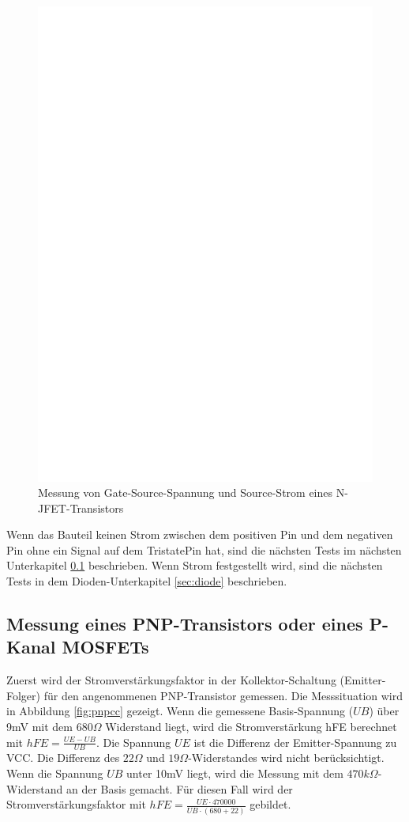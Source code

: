 \begin{figure}[H]
\centering
\includegraphics[]{../FIG/JFETcd.eps}
\caption{Messung von Gate-Source-Spannung und Source-Strom eines N-JFET-Transistors}
\label{fig:JFETcd}
\end{figure}

Wenn das Bauteil keinen Strom zwischen dem positiven Pin und dem negativen Pin ohne ein Signal
auf dem TristatePin hat, sind die n\"achsten Tests im n\"achsten Unterkapitel \ref{sec:pnp} beschrieben.
Wenn Strom festgestellt wird, sind die n\"achsten Tests in dem Dioden-Unterkapitel \ref{sec:diode} beschrieben.

\subsection{Messung eines PNP-Transistors oder eines P-Kanal MOSFETs}
\label{sec:pnp}
Zuerst wird der Stromverst\"arkungsfaktor in der Kollektor-Schaltung (Emitter-Folger) f\"ur den angenommenen
PNP-Transistor gemessen.
Die Messsituation wird in Abbildung \ref{fig:pnpcc} gezeigt.
Wenn die gemessene Basis-Spannung (\(UB\)) \"uber 9mV mit dem \(680\Omega\) Widerstand liegt,
wird die Stromverst\"arkung hFE berechnet mit \(hFE = \frac{UE-UB}{UB}\). 
Die Spannung \(UE\) ist die Differenz der Emitter-Spannung zu VCC.
Die Differenz des \(22\Omega\) und \(19\Omega\)-Widerstandes wird nicht ber\"ucksichtigt.
Wenn die Spannung \(UB\) unter 10mV liegt, wird die Messung mit dem \(470k\Omega\)-Widerstand an der Basis gemacht.
F\"ur diesen Fall wird der Stromverst\"arkungsfaktor mit \(hFE = \frac{UE \cdot 470000}{UB \cdot (680+22)}\) gebildet.

